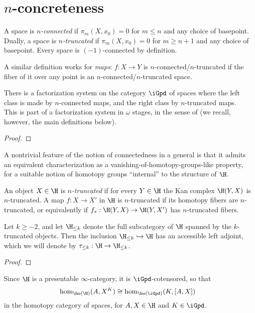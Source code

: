 \documentclass[10pt,a4paper]{amsart}
\begin{document}
\section{$n$-concreteness}
\begin{definition}
A space is \emph{$n$-connected} if $\pi_m(X,x_0) = 0$ for $m\le n$ and any choice of basepoint. Dually, a space is \emph{$n$-truncated} if $\pi_m(X,x_0) = 0$ for $m\ge n+1$ and any choice of basepoint. Every space is $(-1)$-connected by definition.

A similar definition works for \emph{maps}: $f \colon X \to Y$ is $n$-connected\fshyp{}$n$-truncated if the fiber of it over any point is an $n$-connected\fshyp{}$n$-truncated space.
\end{definition}
\begin{proposition}
There is a factorization system on the category $\iGpd$ of spaces where the left class is made by $n$-connected maps, and the right class by $n$-truncated maps. This is part of a factorization system in $\omega$ stages, in the sense of \cite[\adef \textbf{1.5.10}]{tstructures} (we recall, however, the main definitions below).
\end{proposition}
\begin{proof}

\end{proof}
A nontrivial feature of the notion of connectedness in a general \inftop is that it admits an equivalent characterization as a vanishing-of-homotopy-groups-like property, for a suitable notion of homotopy groups ``internal'' to the structure of $\H$. 
\begin{definition}
An object $X\in\H$ is \emph{$n$-truncated} if for every $Y\in\H$ the Kan complex $\H(Y,X)$ is $n$-truncated. A map $f : X \to X'$ in $\H$ is $n$-truncated if its homotopy fibers are $n$-truncated, or equivalently if $f_* : \H(Y,X) \to \H(Y,X')$ has $n$-truncated fibers.
\end{definition}
\begin{proposition}
Let $k\ge -2$, and let $\H_{\le k}$ denote the full subcategory of $\H$ spanned by the $k$-truncated objects.
Then the inclusion $\H_{\le k} \hookrightarrow \H$ has an accessible left adjoint, which we will denote by $\tau_{\le k} : \H \to \H_{\le k}$.
\end{proposition}
\begin{proof}

\end{proof}
\begin{remark}
Since $\H$ is a presentable $\infty$-category, it is $\iGpd$-cotensored, so that
\[
\hom_{\ho(\H)}(A, X^K) \cong \hom_{\ho(\iGpd)}(K,[A,X])
\]
in the homotopy category of spaces, for $A,X\in\H$ and $K\in\iGpd$.
\end{remark}
\end{document}
